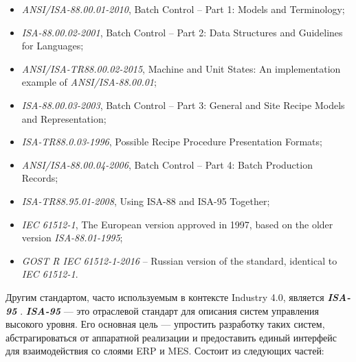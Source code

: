 \begin{itemize}
    \item \textit{ANSI/ISA-88.00.01-2010}, Batch Control -- Part 1: Models and Terminology;
    \item \textit{ISA-88.00.02-2001}, Batch Control -- Part 2: Data Structures and Guidelines for Languages;
    \item \textit{ANSI/ISA-TR88.00.02-2015}, Machine and Unit States: An implementation example of \textit{ANSI/ISA-88.00.01};
    \item \textit{ISA-88.00.03-2003}, Batch Control -- Part 3: General and Site Recipe Models and Representation;
    \item \textit{ISA-TR88.0.03-1996}, Possible Recipe Procedure Presentation Formats;
    \item \textit{ANSI/ISA-88.00.04-2006}, Batch Control -- Part 4: Batch Production Records;
    \item \textit{ISA-TR88.95.01-2008}, Using ISA-88 and ISA-95 Together;
    \item \textit{IEC 61512-1}, The European version approved in 1997, based on the older version \textit{ISA-88.01-1995};
    \item \textit{GOST R IEC 61512-1-2016} -- Russian version of the standard, identical to \textit{IEC 61512-1}.
\end{itemize}

Другим стандартом, часто используемым в контексте Industry 4.0, является \textit{\textbf{ISA-95}} \cite{ISA95}. \textit{\textbf{ISA-95}} — это отраслевой стандарт для описания систем управления высокого уровня. Его основная цель — упростить разработку таких систем, абстрагироваться от аппаратной реализации и предоставить единый интерфейс для взаимодействия со слоями ERP и MES. Состоит из следующих частей:

